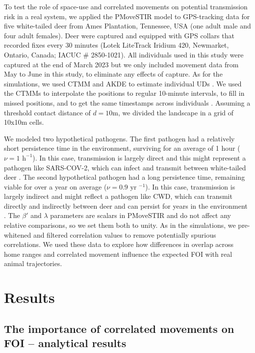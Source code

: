 ﻿\documentclass[11pt]{article}
\begin{document}
To test the role of space-use and correlated movements on potential transmission risk in a real system, we applied the PMoveSTIR model to GPS-tracking data for five white-tailed deer from Ames Plantation, Tennessee, USA (one adult male and four adult females). 
Deer were captured and equipped with GPS collars that recorded fixes every 30 minutes (Lotek LiteTrack Iridium 420, Newmarket, Ontario, Canada; IACUC \# 2850-1021).  All individuals used in this study were captured at the end of March 2023 but we only included movement data from May to June in this study, to eliminate any effects of capture.  As for the simulations, we used CTMM and AKDE to estimate individual UDs \citep{Calabrese2016}. We used the CTMMs to interpolate the positions to regular 10-minute intervals, to fill in missed positions, and to get the same timestamps across individuals \citep{Yang2023}.  Assuming a threshold contact distance of $d=10$m, we divided the landscape in a grid of 10x10m cells. 

We modeled two hypothetical pathogens. The first pathogen had a relatively short persistence time in the environment, surviving for an average of 1 hour  ($\nu=1\text{ h}^{-1 }$). In this case, transmission is largely direct and this might represent a pathogen like SARS-COV-2, which can infect and transmit between white-tailed deer \citep{Hale2022}. The second hypothetical pathogen had a long persistence time, remaining viable for over a year on average ($\nu=0.9 \text{ yr }^{-1}$). In this case, transmission is largely indirect and might reflect a pathogen like CWD, which can transmit directly and indirectly between deer and can persist for years in the environment \citep{Saunders2012a}. The $\beta'$ and $\lambda$ parameters are scalars in PMoveSTIR and do not affect any relative comparisons, so we set them both to unity. As in the simulations, we pre-whitened and filtered correlation values to remove potentially spurious correlations. 
We used these data to explore how differences in overlap across home ranges and correlated movement influence the expected FOI with real animal trajectories.

\section*{Results}

\subsection*{The importance of correlated movements on FOI -- analytical results}
\end{document}
